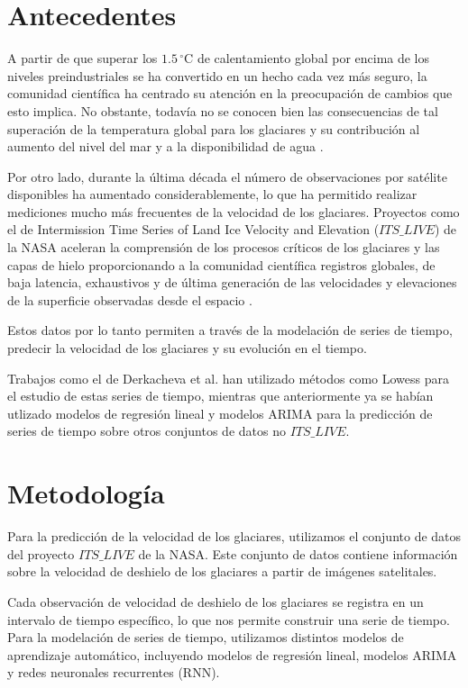 \documentclass[sigconf,authordraft,language=spanish]{acmart}
\begin{document}
\section{Antecedentes}

A partir de que superar los $1.5\,^\circ\mathrm{C}$ de calentamiento global por encima de los niveles preindustriales se ha convertido en un hecho cada vez más seguro, 
la comunidad científica ha centrado su atención en la preocupación de cambios que esto implica. 
No obstante, todavía no se conocen bien las consecuencias de tal superación de la temperatura global para los glaciares y su contribución al aumento del nivel del mar y a la disponibilidad de agua \cite{schuster_2025}.


Por otro lado, durante la última década el número de observaciones por satélite disponibles ha aumentado considerablemente, 
lo que ha permitido realizar mediciones mucho más frecuentes de la velocidad de los glaciares.
Proyectos como el de Intermission Time Series of Land Ice Velocity and Elevation ($ITS\_LIVE$) de la NASA 
aceleran la comprensión de los procesos críticos de los glaciares y las capas de hielo proporcionando a la comunidad científica registros globales, 
de baja latencia, exhaustivos y de última generación de las velocidades y elevaciones de la superficie observadas desde el espacio \cite{lei_processing_2021} .

Estos datos por lo tanto permiten a través de la modelación de series de tiempo,
predecir la velocidad de los glaciares y su evolución en el tiempo. 

Trabajos como el de Derkacheva et al. \cite{derkacheva_data_2020} han utilizado métodos como Lowess para el estudio de estas series de tiempo, mientras que anteriormente 
ya se habían utlizado modelos de regresión lineal y modelos ARIMA para la predicción de series de tiempo \cite{noauthor_time_2022} sobre otros conjuntos de datos no  $ITS\_LIVE$.

\section{Metodología}

Para la predicción de la velocidad de los glaciares, utilizamos el conjunto de datos del proyecto  $ITS\_LIVE$ de la NASA.
Este conjunto de datos contiene información sobre la velocidad de deshielo de los glaciares a partir de imágenes satelitales.

Cada observación de velocidad de deshielo de los glaciares se registra en un intervalo de tiempo específico, lo que nos permite construir una serie de tiempo.
Para la modelación de series de tiempo, utilizamos distintos modelos de aprendizaje automático, incluyendo modelos de regresión lineal, modelos ARIMA y redes neuronales recurrentes (RNN).
\end{document}
